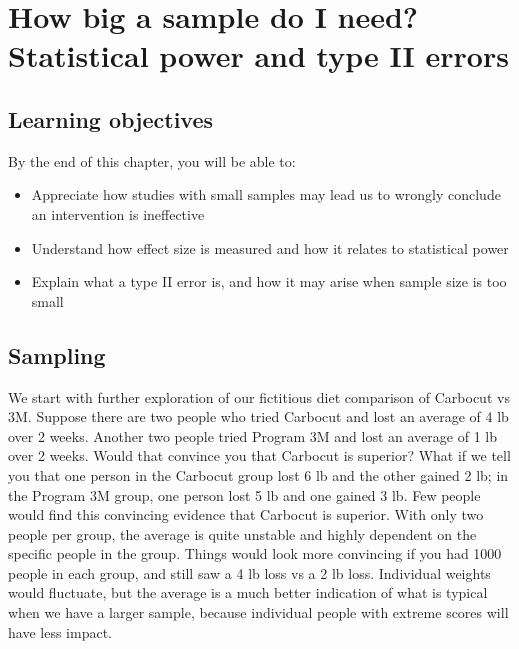 \documentclass{krantz}
\begin{document}
\hypertarget{power}{%
\chapter{How big a sample do I need? Statistical power and type II errors}\label{power}}

\hypertarget{learning-objectives-11}{%
\section{Learning objectives}\label{learning-objectives-11}}

By the end of this chapter, you will be able to:

\begin{itemize}
\item
  Appreciate how studies with small samples may lead us to wrongly conclude an intervention is ineffective
\item
  Understand how effect size is measured and how it relates to statistical power
\item
  Explain what a type II error is, and how it may arise when sample size is too small
\end{itemize}

\hypertarget{sampling}{%
\section{Sampling}\label{sampling}}

We start with further exploration of our fictitious diet comparison of Carbocut vs 3M. Suppose there are two people who tried Carbocut and lost an average of 4 lb over 2 weeks. Another two people tried Program 3M and lost an average of 1 lb over 2 weeks. Would that convince you that Carbocut is superior? What if we tell you that one person in the Carbocut group lost 6 lb and the other gained 2 lb; in the Program 3M group, one person lost 5 lb and one gained 3 lb. Few people would find this convincing evidence that Carbocut is superior. With only two people per group, the average is quite unstable and highly dependent on the specific people in the group. Things would look more convincing if you had 1000 people in each group, and still saw a 4 lb loss vs a 2 lb loss. Individual weights would fluctuate, but the average is a much better indication of what is typical when we have a larger sample, because individual people with extreme scores will have less impact.
\end{document}
